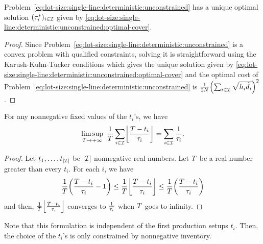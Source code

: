 \begin{lem}\label{lem:lot-size:single-line:deterministic:unconstrained:optimality}
Problem~\eqref{eq:lot-size:single-line:deterministic:unconstrained} has a unique optimal solution $(\tau_i^*)_{i\in\mathcal{I}}$ given by \cref{eq:lot-size:single-line:deterministic:unconstrained:optimal-cover}.
\end{lem}


\begin{proof}
Since Problem~\eqref{eq:lot-size:single-line:deterministic:unconstrained} is a convex problem with qualified constraints, solving it is straightforward using the Karush-Kuhn-Tucker conditions which gives the unique solution given by \cref{eq:lot-size:single-line:deterministic:unconstrained:optimal-cover} and the optimal cost of Problem~\eqref{eq:lot-size:single-line:deterministic:unconstrained} is $\frac{1}{2\nbsetups}\bracket{\sum_{i\in\REF}\sqrt{\holding_i\tilde{\demand_i}}}^2$.
\end{proof}



\begin{lem}\label{lem:lot-size:deterministic:single-line:models:average-setup}
For any nonnegative fixed values of the $t_i$'s, we have
\begin{equation}
\limsup_{\horizon\rightarrow+\infty}\ \frac{1}{\horizon} \sum_{i\in\REF} \left\lfloor\frac{\horizon-t_i}{\cover_i}\right\rfloor
=
\sum_{i\in\REF} \frac{1}{\cover_i}.
\end{equation}
\end{lem}


\begin{proof}
Let $t_1,\ldots,t_{\card{\REF}}$ be $\card{\REF}$ nonnegative real numbers.
Let $T$ be a real number greater than every $t_i$.
For each $i$, we have
\begin{equation}
\frac{1}{\horizon}\bracket{\frac{\horizon-t_i}{\cover_i}-1}
\le
\frac{1}{\horizon}\left\lfloor\frac{\horizon-t_i}{\cover_i}\right\rfloor
\le
\frac{1}{\horizon}\bracket{\frac{\horizon-t_i}{\cover_i}}
\end{equation}
and then, $\frac{1}{\horizon}\left\lfloor\frac{\horizon-t_i}{\cover_i}\right\rfloor$ converges to $\frac{1}{\tau_i}$ when $T$ goes to infinity.
\end{proof}


Note that this formulation is independent of the first production setups $t_i$.
Then, the choice of the $t_i$'s is only constrained by nonnegative inventory.


